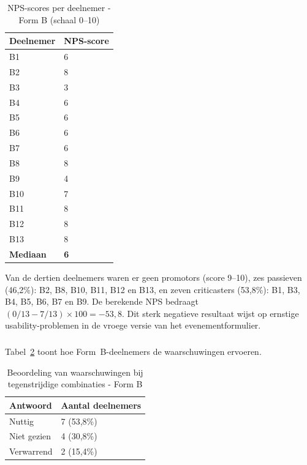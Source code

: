 \begin{table}[h]
  \centering
  \caption[NPS-scores vroege test Form B]{NPS-scores per deelnemer - Form B (schaal 0–10)}
  \label{tab:vroeg-formb-nps}
  \begin{tabular}{ll}
    \hline
    \textbf{Deelnemer} & \textbf{NPS-score} \\
    \hline
    B1  & 6 \\
    B2  & 8 \\
    B3  & 3 \\
    B4  & 6 \\
    B5  & 6 \\
    B6  & 6 \\
    B7  & 6 \\
    B8  & 8 \\
    B9  & 4 \\
    B10 & 7 \\
    B11 & 8 \\
    B12 & 8 \\
    B13 & 8 \\
    \hline
    \textbf{Mediaan} & \textbf{6} \\
    \hline
  \end{tabular}
\end{table}

Van de dertien deelnemers waren er geen promotors (score 9–10), zes passieven (46,2\%): B2, B8, B10, B11, B12 en B13, en zeven criticasters (53,8\%): B1, B3, B4, B5, B6, B7 en B9. De berekende NPS bedraagt $(0/13 - 7/13) \times 100 = -53{,}8$. Dit sterk negatieve resultaat wijst op ernstige usability-problemen in de vroege versie van het evenementformulier.

\subsubsection{}

Tabel~\ref{tab:vroeg-formb-waarschuwingen} toont hoe Form~B-deelnemers de waarschuwingen ervoeren.

\begin{table}[h]
  \centering
  \caption[Beoordeling waarschuwingen vroege test Form B]{Beoordeling van waarschuwingen bij tegenstrijdige combinaties - Form B}
  \label{tab:vroeg-formb-waarschuwingen}
  \begin{tabular}{ll}
    \hline
    \textbf{Antwoord} & \textbf{Aantal deelnemers} \\
    \hline
    Nuttig      & 7 (53,8\%) \\
    Niet gezien & 4 (30,8\%) \\
    Verwarrend  & 2 (15,4\%) \\
    \hline
  \end{tabular}
\end{table}


